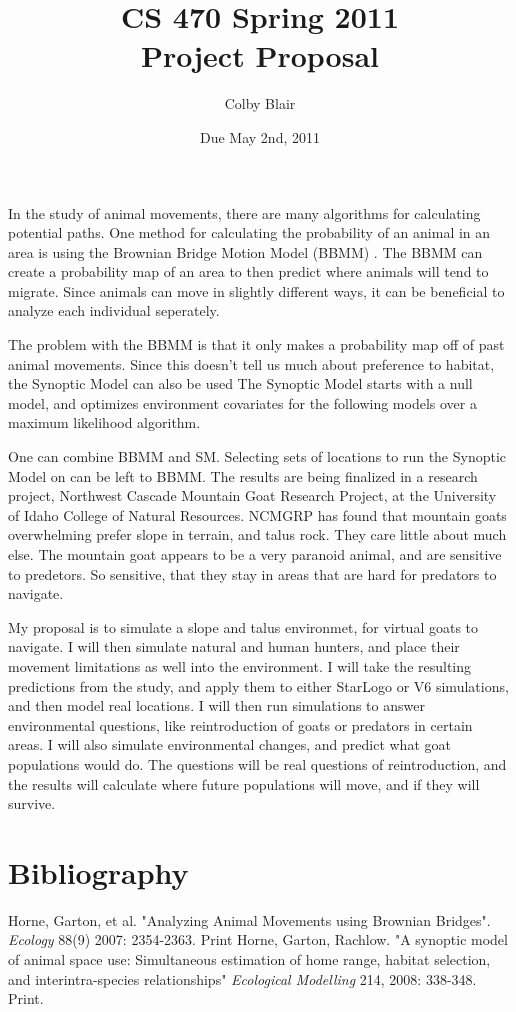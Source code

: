 \documentclass[12pt]{article}
\title{CS 470 Spring 2011 \\
     Project Proposal}
\author{Colby Blair}
\date{Due May 2nd, 2011}
\begin{document}
\maketitle

\pagebreak
\setcounter{page}{1}

In the study of animal movements, there are many algorithms for calculating potential paths. One method for
calculating the probability of an animal in an area is using the Brownian Bridge Motion Model (BBMM) \cite{bb}.
The BBMM can create a probability map of an area to then predict where animals will tend to migrate. Since 
animals can move in slightly different ways, it can be beneficial to analyze each individual seperately.

The problem with the BBMM is that it only makes a probability map off of past animal movements. Since this
doesn't tell us much about preference to habitat, the Synoptic Model \cite{syn} can also be used
The Synoptic Model starts with a null model, and optimizes environment covariates for the following models 
over a maximum likelihood algorithm.

One can combine BBMM and SM. Selecting sets of locations to run the Synoptic Model on can be left to BBMM.
The results are being finalized in a research project, Northwest Cascade Mountain Goat Research Project, at
the University of Idaho College of Natural Resources. NCMGRP has found that mountain goats overwhelming 
prefer slope in terrain, and talus rock. They care little about much else. The mountain goat appears to be
a very paranoid animal, and are sensitive to predetors. So sensitive, that they stay in areas that are hard
for predators to navigate.

My proposal is to simulate a slope and talus environmet, for virtual goats to navigate. I will then simulate
natural and human hunters, and place their movement limitations as well into the environment. I will take the
resulting predictions from the study, and apply them to either StarLogo or V6 simulations, and then model
real locations. I will then run simulations to answer environmental questions, like reintroduction of goats
or predators in certain areas. I will also simulate environmental changes, and predict what goat populations 
would do. The questions will be real questions of reintroduction, and the results will calculate where future 
populations will move, and if they will survive.

\pagebreak

\section{Bibliography}

\begin{thebibliography}{99}
 Horne, Garton, et al. "Analyzing Animal Movements using Brownian 
	Bridges". { \em Ecology } 88(9) 2007: 2354-2363. Print
 Horne, Garton, Rachlow. "A synoptic model of animal space use: 
	Simultaneous estimation of home range, habitat selection, and 
	inter\/intra-species relationships" {\em Ecological Modelling} 
	214, 2008: 338-348. Print.

\end{thebibliography}
\end{document}
